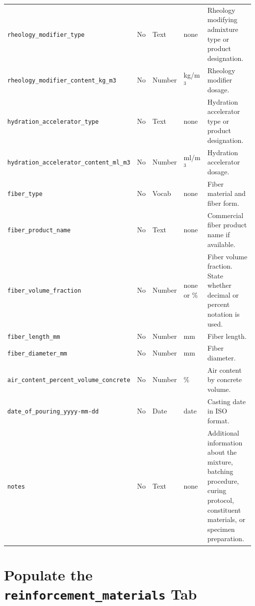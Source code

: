\documentclass[11pt]{book}
\begin{document}
\begin{longtable}{p{}p{}p{}p{}p{}}
\texttt{rheology\_modifier\_type} & No & Text & none & Rheology modifying admixture type or product designation. \\

\texttt{rheology\_modifier\_content\_kg\_m3} & No & Number & kg/m$^3$ & Rheology modifier dosage. \\

\texttt{hydration\_accelerator\_type} & No & Text & none & Hydration accelerator type or product designation. \\

\texttt{hydration\_accelerator\_content\_ml\_m3} & No & Number & ml/m$^3$ & Hydration accelerator dosage. \\

\texttt{fiber\_type} & No & Vocab & none & Fiber material and fiber form. \\

\texttt{fiber\_product\_name} & No & Text & none & Commercial fiber product name if available. \\

\texttt{fiber\_volume\_fraction} & No & Number & none or \% & Fiber volume fraction. State whether decimal or percent notation is used. \\

\texttt{fiber\_length\_mm} & No & Number & mm & Fiber length. \\

\texttt{fiber\_diameter\_mm} & No & Number & mm & Fiber diameter. \\

\texttt{air\_content\_percent\_volume\_concrete} & No & Number & \% & Air content by concrete volume. \\

\texttt{date\_of\_pouring\_yyyy-mm-dd} & No & Date & date & Casting date in ISO format. \\

\texttt{notes} & No & Text & none & Additional information about the mixture, batching procedure, curing protocol, constituent materials, or specimen preparation. \\

\hline

\end{longtable}
\normalsize

\section{Populate the \texttt{reinforcement\_materials} Tab}
\end{document}

